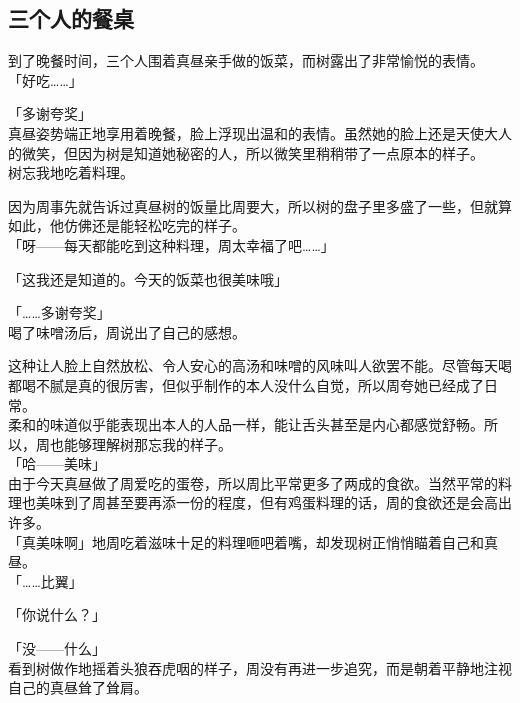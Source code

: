 \subsection{三个人的餐桌}

到了晚餐时间，三个人围着真昼亲手做的饭菜，而树露出了非常愉悦的表情。\\

「好吃……」

「多谢夸奖」\\

真昼姿势端正地享用着晚餐，脸上浮现出温和的表情。虽然她的脸上还是天使大人的微笑，但因为树是知道她秘密的人，所以微笑里稍稍带了一点原本的样子。\\

树忘我地吃着料理。

因为周事先就告诉过真昼树的饭量比周要大，所以树的盘子里多盛了一些，但就算如此，他仿佛还是能轻松吃完的样子。\\

「呀——每天都能吃到这种料理，周太幸福了吧……」

「这我还是知道的。今天的饭菜也很美味哦」

「……多谢夸奖」\\

喝了味噌汤后，周说出了自己的感想。

这种让人脸上自然放松、令人安心的高汤和味噌的风味叫人欲罢不能。尽管每天喝都喝不腻是真的很厉害，但似乎制作的本人没什么自觉，所以周夸她已经成了日常。\\

柔和的味道似乎能表现出本人的人品一样，能让舌头甚至是内心都感觉舒畅。所以，周也能够理解树那忘我的样子。\\

「哈——美味」\\

由于今天真昼做了周爱吃的蛋卷，所以周比平常更多了两成的食欲。当然平常的料理也美味到了周甚至要再添一份的程度，但有鸡蛋料理的话，周的食欲还是会高出许多。\\

「真美味啊」地周吃着滋味十足的料理咂吧着嘴，却发现树正悄悄瞄着自己和真昼。\\

「……比翼」

「你说什么？」

「没——什么」\\

看到树做作地摇着头狼吞虎咽的样子，周没有再进一步追究，而是朝着平静地注视自己的真昼耸了耸肩。\\

